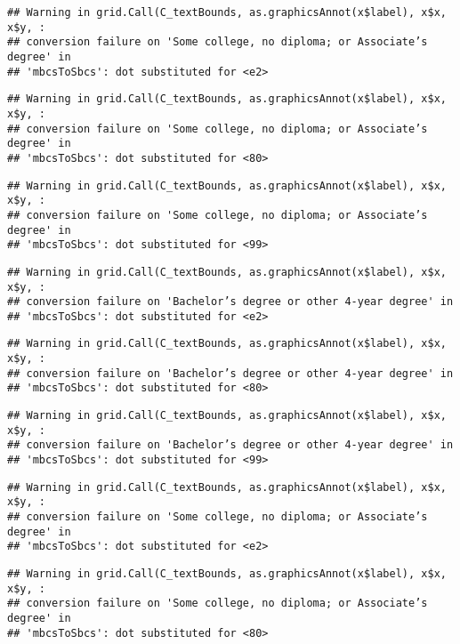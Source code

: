 \documentclass[
]{article}
\begin{document}
\begin{verbatim}
## Warning in grid.Call(C_textBounds, as.graphicsAnnot(x$label), x$x, x$y, :
## conversion failure on 'Some college, no diploma; or Associate’s degree' in
## 'mbcsToSbcs': dot substituted for <e2>
\end{verbatim}

\begin{verbatim}
## Warning in grid.Call(C_textBounds, as.graphicsAnnot(x$label), x$x, x$y, :
## conversion failure on 'Some college, no diploma; or Associate’s degree' in
## 'mbcsToSbcs': dot substituted for <80>
\end{verbatim}

\begin{verbatim}
## Warning in grid.Call(C_textBounds, as.graphicsAnnot(x$label), x$x, x$y, :
## conversion failure on 'Some college, no diploma; or Associate’s degree' in
## 'mbcsToSbcs': dot substituted for <99>
\end{verbatim}

\begin{verbatim}
## Warning in grid.Call(C_textBounds, as.graphicsAnnot(x$label), x$x, x$y, :
## conversion failure on 'Bachelor’s degree or other 4-year degree' in
## 'mbcsToSbcs': dot substituted for <e2>
\end{verbatim}

\begin{verbatim}
## Warning in grid.Call(C_textBounds, as.graphicsAnnot(x$label), x$x, x$y, :
## conversion failure on 'Bachelor’s degree or other 4-year degree' in
## 'mbcsToSbcs': dot substituted for <80>
\end{verbatim}

\begin{verbatim}
## Warning in grid.Call(C_textBounds, as.graphicsAnnot(x$label), x$x, x$y, :
## conversion failure on 'Bachelor’s degree or other 4-year degree' in
## 'mbcsToSbcs': dot substituted for <99>
\end{verbatim}

\begin{verbatim}
## Warning in grid.Call(C_textBounds, as.graphicsAnnot(x$label), x$x, x$y, :
## conversion failure on 'Some college, no diploma; or Associate’s degree' in
## 'mbcsToSbcs': dot substituted for <e2>
\end{verbatim}

\begin{verbatim}
## Warning in grid.Call(C_textBounds, as.graphicsAnnot(x$label), x$x, x$y, :
## conversion failure on 'Some college, no diploma; or Associate’s degree' in
## 'mbcsToSbcs': dot substituted for <80>
\end{verbatim}
\end{document}
